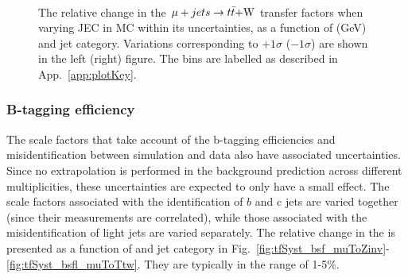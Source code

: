 \begin{figure}[!h]
  \centering
   ~~
  \\

  \caption{\label{fig:tfSyst_jec_muToTtw} The relative change in the
  $\mu + jets \rightarrow t\bar{t}\mathrm{+W}$ transfer
  factors when varying JEC in MC within its uncertainties, as a function of \scalht (GeV) and jet category. 
  Variations corresponding to $+1\sigma$ ($-1\sigma$) are shown in the left (right) figure. The bins are
    labelled as described in App.~\ref{app:plotKey}.
  }
\end{figure}


\subsubsection*{B-tagging efficiency}
\label{sec:tfSyst_btag}
The scale factors that take account of the b-tagging efficiencies and
misidentification between simulation and data also have associated
uncertainties. Since no extrapolation is performed in the background
prediction across different \nb multiplicities, these uncertainties
are expected to only have a small effect.  The scale factors
associated with the identification of $b$ and c jets are varied together
(since their measurements are correlated), while those associated with
the misidentification of light jets are varied separately. The
relative change in the \TFs is presented as a function of \HT and jet
category in
Fig.~\ref{fig:tfSyst_bsf_muToZinv}-\ref{fig:tfSyst_bsfl_muToTtw}. They
are typically in the range of 1-5\%.

